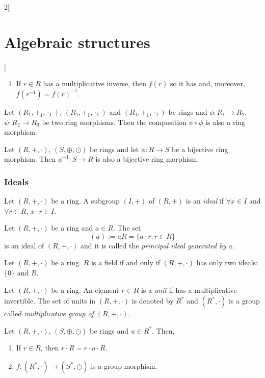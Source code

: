 \documentclass[class=article,10pt,crop=false]{standalone}
\begin{document}
\begin{multicols}{2}[\section{Algebraic structures}]
\begin{prop}
\begin{enumerate}
    \item If $r\in R$ has a multiplicative inverse, then $f(r)$ so it has and, moreover, $f(r^{-1})=f(r)^{-1}$.
\end{enumerate}
\end{prop}
\begin{prop}
Let $(R_1,+_1,\cdot_1)$, $(R_1,+_1,\cdot_1)$ and $(R_1,+_1,\cdot_1)$ be rings and $\phi:R_1\rightarrow R_2$, $\psi:R_2\rightarrow R_3$ be two ring morphisms. Then the composition $\psi\circ\phi$ is also a ring morphism.
\end{prop}
\begin{prop}
Let $(R,+,\cdot)$, $(S,\oplus,\odot)$ be rings and let $\phi: R\rightarrow S$ be a bijective ring morphism. Then $\phi^{-1}: S\rightarrow R$ is also a bijective ring morphism.
\end{prop}
\subsubsection*{Ideals}
\begin{definition}
Let $(R,+,\cdot)$ be a ring. A subgroup $(I,+)$ of $(R,+)$ is an \textit{ideal} if $\forall x\in I$ and $\forall r\in R$, $x\cdot r\in I$.
\end{definition}
\begin{lemma}
Let $(R,+,\cdot)$ be a ring and $a\in R$. The set $$(a):=aR=\{a\cdot r:r\in R\}$$ is an ideal of $(R,+,\cdot)$ and it is called the \textit{principal ideal generated by $a$}.
\end{lemma}
\begin{prop}
Let $(R,+,\cdot)$ be a ring. $R$ is a field if and only if $(R,+,\cdot)$ has only two ideals: $\{0\}$ and $R$.
\end{prop}
\begin{definition}
Let $(R,+,\cdot)$ be a ring. An element $r\in R$ is a \textit{unit} if has a multiplicative invertible. The set of units in $(R,+,\cdot)$ is denoted by $R^*$ and $(R^*,\cdot)$ is a group called \textit{multiplicative group of $(R,+,\cdot)$}.
\end{definition}
\begin{lemma}
Let $(R,+,\cdot)$, $(S,\oplus,\odot)$ be rings and $u\in R^*$. Then,
\begin{enumerate}
    \item If $r\in R$, then $r\cdot R=r\cdot u\cdot R$.
    \item $f:(R^*,\cdot)\rightarrow (S^*,\odot)$ is a group morphism.
\end{enumerate}

\end{lemma}
\end{multicols}
\end{document}
